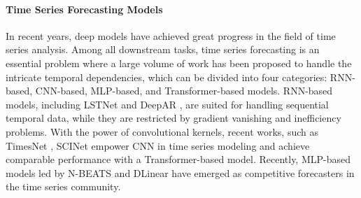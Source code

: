 \documentclass[nohyperref]{article}
\theoremstyle{plain}
\theoremstyle{definition}
\theoremstyle{remark}
\begin{document}
\paragraph{Time Series Forecasting Models}
In recent years, deep models have achieved great progress in the field of time series analysis. Among all downstream tasks, time series forecasting is an essential problem where a large volume of work has been proposed to handle the intricate temporal dependencies, which can be divided into four categories: RNN-based, CNN-based, MLP-based, and Transformer-based models. RNN-based models, including LSTNet \cite{lai2018modeling} and DeepAR \cite{salinas2020deepar}, are suited for handling sequential temporal data, while they are restricted by gradient vanishing and inefficiency problems. With the power of convolutional kernels, recent works, such as TimesNet \cite{wu2023timesnet}, SCINet \cite{liu2022scinet} empower CNN in time series modeling and achieve comparable performance with a Transformer-based model.
Recently, MLP-based models led by N-BEATS \cite{oreshkin2019n} and DLinear \cite{zeng2023transformers} have emerged as competitive forecasters in the time series community. 
\end{document}
